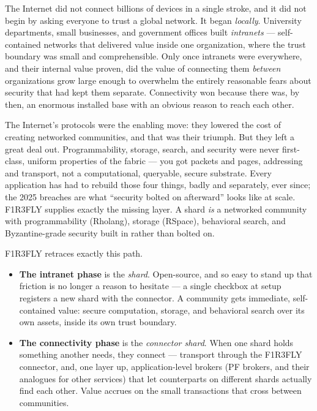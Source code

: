 \documentclass[11pt]{article}
\begin{document}
The Internet did not connect billions of devices in a single stroke, and it did not begin by asking everyone to trust a global network. It began \emph{locally}. University departments, small businesses, and government offices built \emph{intranets} --- self-contained networks that delivered value inside one organization, where the trust boundary was small and comprehensible. Only once intranets were everywhere, and their internal value proven, did the value of connecting them \emph{between} organizations grow large enough to overwhelm the entirely reasonable fears about security that had kept them separate. Connectivity won because there was, by then, an enormous installed base with an obvious reason to reach each other.

The Internet's protocols were the enabling move: they lowered the cost of creating networked communities, and that was their triumph. But they left a great deal out. Programmability, storage, search, and security were never first-class, uniform properties of the fabric --- you got packets and pages, addressing and transport, not a computational, queryable, secure substrate. Every application has had to rebuild those four things, badly and separately, ever since; the 2025 breaches are what ``security bolted on afterward'' looks like at scale. F1R3FLY supplies exactly the missing layer. A shard \emph{is} a networked community with programmability (Rholang), storage (RSpace), behavioral search, and Byzantine-grade security built in rather than bolted on.

\begin{keybox}
F1R3FLY retraces exactly this path.
\begin{itemize}[leftmargin=1.2em, itemsep=3pt, topsep=2pt]
  \item \textbf{The intranet phase} is the \emph{shard}. Open-source, and so easy to stand up that friction is no longer a reason to hesitate --- a single checkbox at setup registers a new shard with the connector. A community gets immediate, self-contained value: secure computation, storage, and behavioral search over its own assets, inside its own trust boundary.
  \item \textbf{The connectivity phase} is the \emph{connector shard}. When one shard holds something another needs, they connect --- transport through the F1R3FLY connector, and, one layer up, application-level brokers (PF brokers, and their analogues for other services) that let counterparts on different shards actually find each other. Value accrues on the small transactions that cross between communities.
\end{itemize}
\end{keybox}
\end{document}
